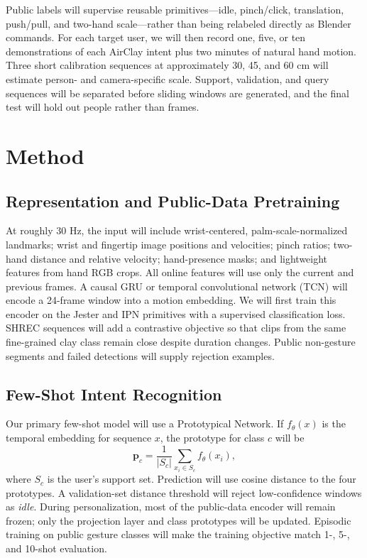 \documentclass{article}
\begin{document}
Public labels will supervise reusable primitives---idle, pinch/click,
translation, push/pull, and two-hand scale---rather than being relabeled
directly as Blender commands. For each target user, we will then record one,
five, or ten demonstrations of each AirClay intent plus two minutes of natural
hand motion. Three short calibration sequences at approximately 30, 45, and
60 cm will estimate person- and camera-specific scale. Support, validation, and
query sequences will be separated before sliding windows are generated, and
the final test will hold out people rather than frames.

\section{Method}

\subsection{Representation and Public-Data Pretraining}

At roughly 30 Hz, the input will include wrist-centered, palm-scale-normalized
landmarks; wrist and fingertip image positions and velocities; pinch ratios;
two-hand distance and relative velocity; hand-presence masks; and lightweight
features from hand RGB crops. All online features will use only the current and
previous frames. A causal GRU or temporal convolutional network (TCN) will
encode a 24-frame window into a motion embedding. We will first train this
encoder on the Jester and IPN primitives with a supervised classification loss.
SHREC sequences will add a contrastive objective so that clips from the same
fine-grained clay class remain close despite duration changes. Public
non-gesture segments and failed detections will supply rejection examples.

\subsection{Few-Shot Intent Recognition}

Our primary few-shot model will use a Prototypical Network. If
$f_{\theta}(x)$ is the temporal embedding for sequence $x$, the prototype for
class $c$ will be
\begin{equation}
  \mathbf{p}_c = \frac{1}{|S_c|}\sum_{x_i \in S_c} f_{\theta}(x_i),
\end{equation}
where $S_c$ is the user's support set. Prediction will use cosine distance to
the four prototypes. A validation-set distance threshold will reject
low-confidence windows as \textit{idle}. During personalization, most of the
public-data encoder will remain frozen; only the projection layer and class
prototypes will be updated. Episodic training on public gesture classes will
make the training objective match 1-, 5-, and 10-shot evaluation.
\end{document}

